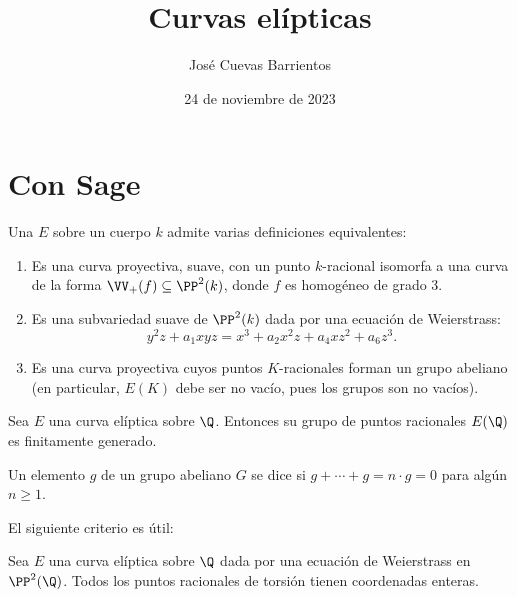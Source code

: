 \documentclass[11pt, reqno]{amsart}
\title{Curvas elípticas}
\date{24 de noviembre de 2023}
\author[José Cuevas]{José Cuevas Barrientos}
\begin{document}
\maketitle

\section{Con Sage}
Una  $E$ sobre un cuerpo $k$ admite varias definiciones equivalentes:
\begin{enumerate}
	\item Es una curva proyectiva, suave, con un punto $k$-racional isomorfa a una curva de la forma $\VV_+(f) \subseteq \PP^2(k)$,
		donde $f$ es homogéneo de grado 3.
	\item Es una subvariedad suave de $\PP^2(k)$ dada por una ecuación de Weierstrass:
		$$ y^2z + a_1xyz = x^3 + a_2x^2z + a_4xz^2 + a_6z^3. $$
	\item Es una curva proyectiva cuyos puntos $K$-racionales forman un grupo abeliano
		(en particular, $E(K)$ debe ser no vacío, pues los grupos son no vacíos).
\end{enumerate}
\begin{thm}
	Sea $E$ una curva elíptica sobre $\Q$.
	Entonces su grupo de puntos racionales $E(\Q)$ es finitamente generado.
\end{thm}

\begin{mydef}
	Un elemento $g$ de un grupo abeliano $G$ se dice  si $g + \cdots + g = n\cdot g = 0$ para algún $n \ge 1$.
\end{mydef}
El siguiente criterio es útil:
\begin{thm}
	Sea $E$ una curva elíptica sobre $\Q$ dada por una ecuación de Weierstrass en $\PP^2(\Q)$.
	Todos los puntos racionales de torsión tienen coordenadas enteras.
\end{thm}
\end{document}
